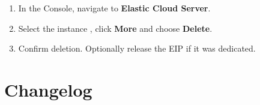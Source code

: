 \documentclass{guide}
\begin{document}
\begin{objectives}
\end{objectives}

\stepbystep
\begin{enumerate}
  \item In the Console, navigate to \textbf{Elastic Cloud Server}.
  \item Select the instance , click \textbf{More} and
        choose \textbf{Delete}.
  \item Confirm deletion. Optionally release the EIP if it was dedicated.
\end{enumerate}


\section{Changelog}
\end{document}
